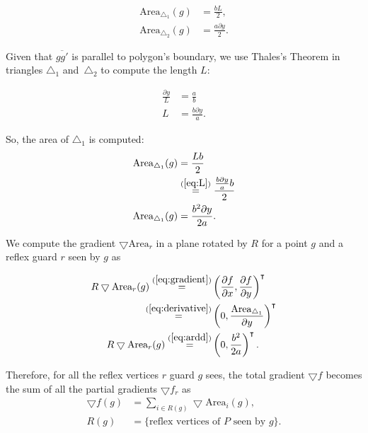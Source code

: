 \begin{align*}
    \text{Area}_{\triangle_1}(g) &= \frac{b L}{2},\\ 
    \text{Area}_{\triangle_2}(g) &= \frac{a \partial y}{2}.
\end{align*}


Given that $\overline{gg'}$ is parallel to polygon's boundary, we  use Thales's Theorem \cite{allman1889greek} in triangles $\triangle_1$ and~$\triangle_2$ to compute the length $L$: 

\begin{align}
    \frac{\partial y}{L} &= \frac a b \nonumber \\ 
    L &= \frac{b \partial y}{a}. \label{eq:L}
\end{align}

So, the area of $\triangle_1$ is computed:
\begin{align}
    \text{Area}_{\triangle_1}(g) &= \frac{Lb}{2} \nonumber \\ 
    &\overset{(\ref{eq:L})}{=} \frac{\frac{b \partial y}{a}b}{2} \nonumber \\ 
    \text{Area}_{\triangle_1}(g) &= \frac{b^2 \partial y}{2a}. \label{eq:ardd}
\end{align}

We compute the gradient $\bigtriangledown \text{Area}_r$ in a plane rotated by $R$ for a point $g$ and a reflex guard $r$ seen by $g$ as

\begin{align}
    R\bigtriangledown \text{Area}_r(g) \overset{(\ref{eq:gradient})}{=} &\left(\frac{\partial f}{\partial x}, \frac{\partial f}{\partial y}\right)^\intercal \nonumber \\
    \overset{(\ref{eq:derivative})}{=} &\left(0, \frac{\text{Area}_{\triangle_1}}{\partial y}\right)^\intercal \nonumber \\
    R\bigtriangledown \text{Area}_r(g) \overset{(\ref{eq:ardd})}{=} &\left(0, \frac{b^2}{2a}\right)^\intercal. \label{eq:normf1}
\end{align}


Therefore, for all the reflex vertices $r$ guard $g$ sees, the total gradient $\bigtriangledown f$ becomes the sum of all the partial gradients $\bigtriangledown f_r$ as 
\begin{align}
    \bigtriangledown f(g) &= \sum_{i \in R(g)} \bigtriangledown \text{Area}_i(g), \label{eq:normf2} \\ 
    R(g) &= \{\text{reflex vertices of } P \text{ seen by }g\}. \nonumber
\end{align}


